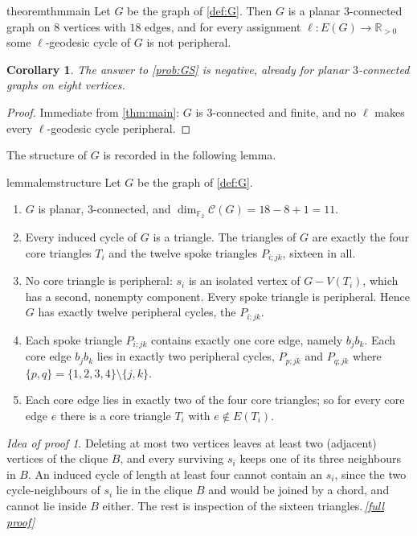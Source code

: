 \documentclass[11pt,a4paper]{article}
\theoremstyle{plain}
\newtheorem{corollary}[theorem]{Corollary}
\theoremstyle{definition}
\theoremstyle{remark}
\newtheorem*{proofidea}{Idea of proof}
\newcommand{\fullproofref}[1]{\,\hyperref[#1]{\textit{[full proof]}}}
\newcommand{\R}{\mathbb R}
\newcommand{\F}{\mathbb F_2}
\newcommand{\cyc}{\mathcal C}
\begin{document}
\begin{restatable}{theorem}{thmmain}\label{thm:main}
Let $G$ be the graph of \cref{def:G}. Then $G$ is a planar $3$-connected graph on $8$ vertices with $18$ edges, and for every assignment $\ell\colon E(G)\to\R_{>0}$ some $\ell$-geodesic cycle of $G$ is not peripheral.
\end{restatable}

\begin{corollary}\label{cor:answer}
The answer to \cref{prob:GS} is negative, already for planar $3$-connected graphs on eight vertices.
\end{corollary}
\begin{proof}
Immediate from \cref{thm:main}: $G$ is $3$-connected and finite, and no $\ell$ makes every $\ell$-geodesic cycle peripheral.
\end{proof}

The structure of $G$ is recorded in the following lemma.

\begin{restatable}[Structure of $G$]{lemma}{lemstructure}\label{lem:structure}
Let $G$ be the graph of \cref{def:G}.
\begin{enumerate}[label=\textup{(\alph*)},nosep]
\item\label{it:conn} $G$ is planar, $3$-connected, and $\dim_{\F}\cyc(G)=18-8+1=11$.
\item\label{it:induced} Every induced cycle of $G$ is a triangle. The triangles of $G$ are exactly the four core triangles $T_i$ and the twelve spoke triangles $P_{i;jk}$, sixteen in all.
\item\label{it:periph} No core triangle is peripheral: $s_i$ is an isolated vertex of $G-V(T_i)$, which has a second, nonempty component. Every spoke triangle is peripheral. Hence $G$ has exactly twelve peripheral cycles, the $P_{i;jk}$.
\item\label{it:incidence} Each spoke triangle $P_{i;jk}$ contains exactly one core edge, namely $b_jb_k$. Each core edge $b_jb_k$ lies in exactly two peripheral cycles, $P_{p;jk}$ and $P_{q;jk}$ where $\{p,q\}=\{1,2,3,4\}\setminus\{j,k\}$.
\item\label{it:K4} Each core edge lies in exactly two of the four core triangles; so for every core edge $e$ there is a core triangle $T_i$ with $e\notin E(T_i)$.
\end{enumerate}
\end{restatable}
\begin{proofidea}
Deleting at most two vertices leaves at least two (adjacent) vertices of the clique $B$, and every surviving $s_i$ keeps one of its three neighbours in $B$. An induced cycle of length at least four cannot contain an $s_i$, since the two cycle-neighbours of $s_i$ lie in the clique $B$ and would be joined by a chord, and cannot lie inside $B$ either. The rest is inspection of the sixteen triangles.\fullproofref{pf:structure}
\end{proofidea}
\end{document}
